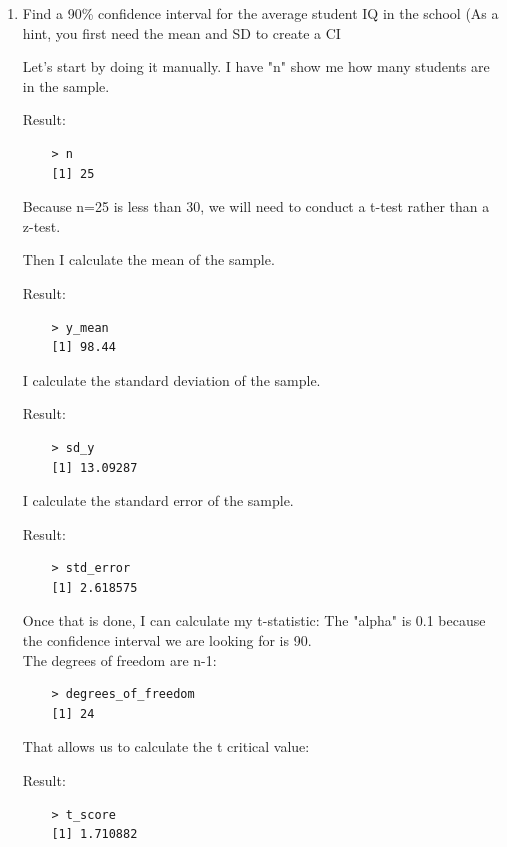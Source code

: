 \documentclass[12pt,letterpaper]{article}
\begin{document}
\begin{enumerate}
	\item Find a 90\% confidence interval for the average student IQ in the school (As a hint, you first need the mean and SD to create a CI

\vspace{4cm}

Let's start by doing it manually.
I have "n" show me how many students are in the sample.
 
Result: 
\begin{verbatim}
	> n
	[1] 25
\end{verbatim}
Because n=25 is less than 30, we will need to conduct a t-test rather than a z-test.

Then I calculate the mean of the sample.
  
Result:
\begin{verbatim}
	> y_mean
	[1] 98.44
\end{verbatim}

I calculate the standard deviation of the sample.
  
Result:
\begin{verbatim}
	> sd_y
	[1] 13.09287
\end{verbatim}

I calculate the standard error of the sample.
  
Result:
\begin{verbatim}
	> std_error
	[1] 2.618575
\end{verbatim}

Once that is done, I can calculate my t-statistic:
\indent The "alpha" is 0.1 because the confidence interval we are looking for is 90.   \\
  
\vspace{.25cm}
\indent The degrees of freedom are n-1:

\begin{verbatim}
	> degrees_of_freedom
	[1] 24
\end{verbatim} 
That allows us to calculate the t critical value:
 
 Result:
 \begin{verbatim}
 	> t_score
 	[1] 1.710882
 \end{verbatim} 
 

\end{enumerate}
\end{document}
